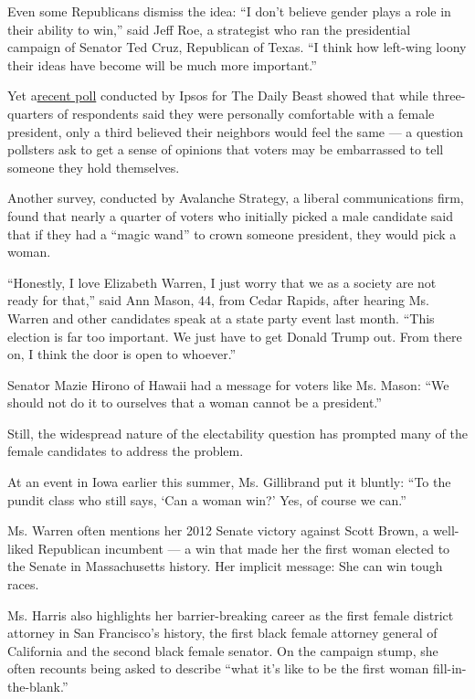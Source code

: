 Even some Republicans dismiss the idea: ``I don't believe gender plays a
role in their ability to win,'' said Jeff Roe, a strategist who ran the
presidential campaign of Senator Ted Cruz, Republican of Texas. ``I
think how left-wing loony their ideas have become will be much more
important.''

Yet
a\href{https://www.thedailybeast.com/elizabeth-warren-and-kamala-harris-are-being-held-back-by-sexist-voters-exclusive-poll-finds?ref=home}{recent
poll} conducted by Ipsos for The Daily Beast showed that while
three-quarters of respondents said they were personally comfortable with
a female president, only a third believed their neighbors would feel the
same --- a question pollsters ask to get a sense of opinions that voters
may be embarrassed to tell someone they hold themselves.

Another survey, conducted by Avalanche Strategy, a liberal
communications firm, found that nearly a quarter of voters who initially
picked a male candidate said that if they had a ``magic wand'' to crown
someone president, they would pick a woman.

``Honestly, I love Elizabeth Warren, I just worry that we as a society
are not ready for that,'' said Ann Mason, 44, from Cedar Rapids, after
hearing Ms. Warren and other candidates speak at a state party event
last month. ``This election is far too important. We just have to get
Donald Trump out. From there on, I think the door is open to whoever.''

Senator Mazie Hirono of Hawaii had a message for voters like Ms. Mason:
``We should not do it to ourselves that a woman cannot be a president.''

Still, the widespread nature of the electability question has prompted
many of the female candidates to address the problem.

At an event in Iowa earlier this summer, Ms. Gillibrand put it bluntly:
``To the pundit class who still says, `Can a woman win?' Yes, of course
we can.''

Ms. Warren often mentions her 2012 Senate victory against Scott Brown, a
well-liked Republican incumbent --- a win that made her the first woman
elected to the Senate in Massachusetts history. Her implicit message:
She can win tough races.

Ms. Harris also highlights her barrier-breaking career as the first
female district attorney in San Francisco's history, the first black
female attorney general of California and the second black female
senator. On the campaign stump, she often recounts being asked to
describe ``what it's like to be the first woman fill-in-the-blank.''

